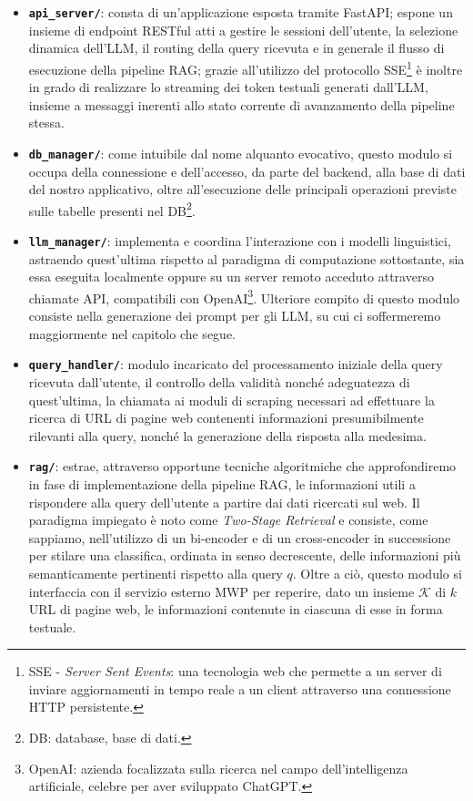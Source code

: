 \begin{itemize}
    \item \texttt{\textbf{api\_server/}}: consta di un'applicazione esposta tramite FastAPI; espone un insieme di endpoint RESTful atti a gestire le sessioni dell'utente, la selezione dinamica dell'LLM, il routing della query ricevuta e in generale il flusso di esecuzione della pipeline RAG; grazie all'utilizzo del protocollo SSE\footnote{SSE - \textit{Server Sent Events}: una tecnologia web che permette a un server di inviare aggiornamenti in tempo reale a un client attraverso una connessione HTTP persistente.} è inoltre in grado di realizzare lo streaming dei token testuali generati dall'LLM, insieme a messaggi inerenti allo stato corrente di avanzamento della pipeline stessa.
    \item \texttt{\textbf{db\_manager/}}: come intuibile dal nome alquanto evocativo, questo modulo si occupa della connessione e dell'accesso, da parte del backend, alla base di dati del nostro applicativo, oltre all'esecuzione delle principali operazioni previste sulle tabelle presenti nel DB\footnote{DB: database, base di dati.}.
    \item \texttt{\textbf{llm\_manager/}}: implementa e coordina l'interazione con i modelli linguistici, astraendo quest'ultima rispetto al paradigma di computazione sottostante, sia essa eseguita localmente oppure su un server remoto acceduto attraverso chiamate API, compatibili con OpenAI\footnote{OpenAI: azienda focalizzata sulla ricerca nel campo dell'intelligenza artificiale, celebre per aver sviluppato ChatGPT.}. Ulteriore compito di questo modulo consiste nella generazione dei prompt per gli LLM, su cui ci soffermeremo maggiormente nel capitolo che segue.
    \item \texttt{\textbf{query\_handler/}}: modulo incaricato del processamento iniziale della query ricevuta dall'utente, il controllo della validità nonché adeguatezza di quest'ultima, la chiamata ai moduli di scraping necessari ad effettuare la ricerca di URL di pagine web contenenti informazioni presumibilmente rilevanti alla query, nonché la generazione della risposta alla medesima.
    \item \texttt{\textbf{rag/}}: estrae, attraverso opportune tecniche algoritmiche che approfondiremo in fase di implementazione della pipeline RAG, le informazioni utili a rispondere alla query dell'utente a partire dai dati ricercati sul web. Il paradigma impiegato è noto come \textit{Two-Stage Retrieval} e consiste, come sappiamo, nell'utilizzo di un bi-encoder e di un cross-encoder in successione per stilare una classifica, ordinata in senso decrescente, delle informazioni più semanticamente pertinenti rispetto alla query $q$. Oltre a ciò, questo modulo si interfaccia con il servizio esterno MWP per reperire, dato un insieme $\mathscr{K}$ di $k$ URL di pagine web, le informazioni contenute in ciascuna di esse in forma testuale.

\end{itemize}
